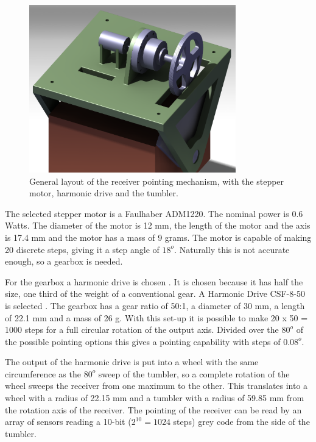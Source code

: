\begin{figure} [h]
\centering
\includegraphics[width=0.8\textwidth, bb=0 0 895px 756px]{chapters/img/point_setup.png}
\caption[General layout of the receiver pointing mechanism]{General layout of the receiver pointing mechanism, with the stepper motor, harmonic drive and the tumbler.}
\label{fig:point}
\end{figure}

The selected stepper motor is a Faulhaber ADM1220. The nominal power is 0.6 Watts. The diameter of the motor is 12 mm, the length of the motor and the axis is 17.4 mm and the motor has a mass of 9 grams. The motor is capable of making 20 discrete steps, giving it a step angle of $18^o$. Naturally this is not accurate enough, so a gearbox is needed.

For the gearbox a harmonic drive is chosen \cite{harmonicdrive}. It is chosen because it has half the size, one third of the weight of a conventional gear. A Harmonic Drive CSF-8-50 is selected \cite{harmweb}. The gearbox has a gear ratio of 50:1, a diameter of 30 mm, a length of 22.1 mm and a mass of 26 g. With this set-up it is possible to make 20 x 50 = 1000 steps for a full circular rotation of the output axis. Divided over the $80^o$ of the possible pointing options this gives a pointing capability with steps of $0.08^o$.

The output of the harmonic drive is put into a wheel with the same circumference as the $80^o$ sweep of the tumbler, so a complete rotation of the wheel sweeps the receiver from one maximum to the other. This translates into a wheel with a radius of 22.15 mm and a tumbler with a radius of 59.85 mm from the rotation axis of the receiver. The pointing of the receiver can be read by an array of sensors reading a 10-bit ($2^10 = 1024$ steps) grey code from the side of the tumbler.

